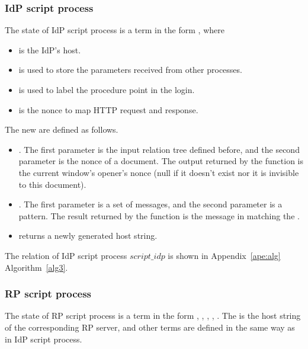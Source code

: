 \subsubsection{IdP script process}
The state of IdP script process  is a term in the form , where
\begin{itemize}
\setlength\itemsep{-2pt}
\item {} is the IdP's host.
\item {} is used to store the parameters received from other processes.
\item {} is used to label the procedure point in the login.
\item {} is the nonce to map HTTP request and response.
\end{itemize}
The new  are defined as follows.
\begin{itemize}
\setlength\itemsep{-2pt}
 \item {}. The first parameter is the input relation tree defined before, and the second parameter is the nonce of a document. The output returned by the function is the current window's opener's nonce (null if it doesn't exist nor it is invisible to this document).
  \item {}. The first parameter is a set of messages, and the second parameter is a pattern. The result returned by the function is the message in  matching the .
  \item {} returns a newly generated host string.
\end{itemize}
The relation of IdP script process $script\_idp$ is shown in Appendix~\ref{ape:alg} Algorithm~\ref{alg3}.




\subsubsection{RP script process}
The state of RP script process  is a term in the form , , , , . The  is the host string of the corresponding RP server, and other terms are defined in the same way as in IdP script process.

